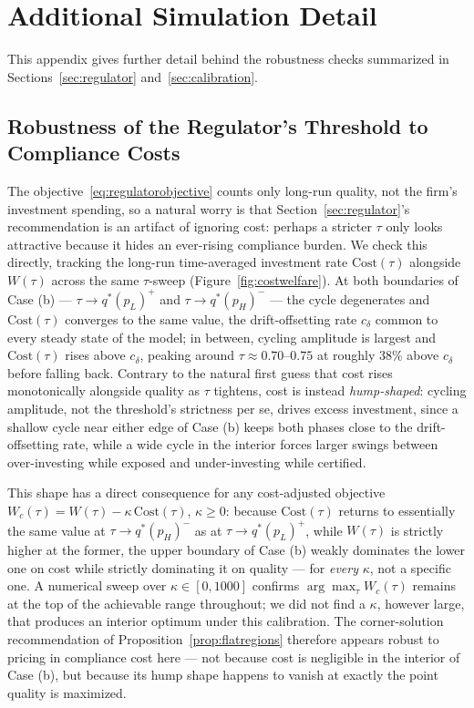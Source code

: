 \section{Additional Simulation Detail}
\label{app:extra-sim}

This appendix gives further detail behind the robustness checks summarized in Sections~\ref{sec:regulator} and~\ref{sec:calibration}.

\subsection{Robustness of the Regulator's Threshold to Compliance Costs}

The objective~\eqref{eq:regulatorobjective} counts only long-run quality, not the firm's investment spending, so a natural worry is that Section~\ref{sec:regulator}'s recommendation is an artifact of ignoring cost: perhaps a stricter $\tau$ only looks attractive because it hides an ever-rising compliance burden. We check this directly, tracking the long-run time-averaged investment rate $\mathrm{Cost}(\tau)$ alongside $W(\tau)$ across the same $\tau$-sweep (Figure~\ref{fig:costwelfare}). At both boundaries of Case (b) — $\tau \to q^*(p_L)^+$ and $\tau \to q^*(p_H)^-$ — the cycle degenerates and $\mathrm{Cost}(\tau)$ converges to the same value, the drift-offsetting rate $c_\delta$ common to every steady state of the model; in between, cycling amplitude is largest and $\mathrm{Cost}(\tau)$ rises above $c_\delta$, peaking around $\tau\approx0.70$--$0.75$ at roughly $38\%$ above $c_\delta$ before falling back. Contrary to the natural first guess that cost rises monotonically alongside quality as $\tau$ tightens, cost is instead \emph{hump-shaped}: cycling amplitude, not the threshold's strictness per se, drives excess investment, since a shallow cycle near either edge of Case (b) keeps both phases close to the drift-offsetting rate, while a wide cycle in the interior forces larger swings between over-investing while exposed and under-investing while certified.

This shape has a direct consequence for any cost-adjusted objective $W_c(\tau) = W(\tau) - \kappa\,\mathrm{Cost}(\tau)$, $\kappa\geq0$: because $\mathrm{Cost}(\tau)$ returns to essentially the same value at $\tau\to q^*(p_H)^-$ as at $\tau \to q^*(p_L)^+$, while $W(\tau)$ is strictly higher at the former, the upper boundary of Case (b) weakly dominates the lower one on cost while strictly dominating it on quality — for \emph{every} $\kappa$, not a specific one. A numerical sweep over $\kappa\in[0,1000]$ confirms $\arg\max_\tau W_c(\tau)$ remains at the top of the achievable range throughout; we did not find a $\kappa$, however large, that produces an interior optimum under this calibration. The corner-solution recommendation of Proposition~\ref{prop:flatregions} therefore appears robust to pricing in compliance cost here — not because cost is negligible in the interior of Case (b), but because its hump shape happens to vanish at exactly the point quality is maximized.

